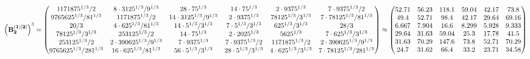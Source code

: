 \documentclass[10pt,a4paper]{article}
\begin{document}
	\[
		\left(\bold{B_2^{(1)[2]}}\right)^{3} = 
		\begin{pmatrix}
			{{1171875^ {1 / 3}}} / {{2}} & {{8} \cdot {3125^ {1 / 3}}} / {{9^ {1 / 3}}} & {{28} \cdot {75^ {1 / 3}}}{} & {{14} \cdot {75^ {1 / 3}}}{} & {{2} \cdot {9375^ {1 / 3}}}{} & {{7} \cdot {9375^ {1 / 3}}} / {{2}} \\
			{{9765625^ {1 / 3}}} / {{81^ {1 / 3}}} & {{1171875^ {1 / 3}}} / {{2}} & {{14} \cdot {3125^ {1 / 3}}} / {{9^ {1 / 3}}} & {{2} \cdot {9375^ {1 / 3}}}{} & {{78125^ {1 / 3}}} / {{3^ {1 / 3}}} & {{7} \cdot {78125^ {1 / 3}}} / {{81^ {1 / 3}}} \\
			{{20}} / {{3}} & {{4} \cdot {625^ {1 / 3}}} / {{81^ {1 / 3}}} & {{14} \cdot {5^ {1 / 3}}} / {{3^ {1 / 3}}} & {{7} \cdot {5^ {1 / 3}}} / {{3^ {1 / 3}}} & {{625^ {1 / 3}}} / {{3^ {1 / 3}}} & {{28}} / {{3}} \\
			{{78125^ {1 / 3}}} / {{3^ {1 / 3}}} & {{253125^ {1 / 3}}} / {{2}} & {{14} \cdot {75^ {1 / 3}}}{} & {{2} \cdot {2025^ {1 / 3}}}{} & {{5625^ {1 / 3}}}{} & {{7} \cdot {625^ {1 / 3}}} / {{3^ {1 / 3}}} \\
			{{253125^ {1 / 3}}} / {{2}} & {{2} \cdot {390625^ {1 / 3}}} / {{9^ {1 / 3}}} & {{7} \cdot {9375^ {1 / 3}}}{} & {{7} \cdot {9375^ {1 / 3}}} / {{2}} & {{1171875^ {1 / 3}}} / {{2}} & {{2} \cdot {390625^ {1 / 3}}} / {{9^ {1 / 3}}} \\
			{{9765625^ {1 / 3}}} / {{2}{81^ {1 / 3}}} & {{16} \cdot {625^ {1 / 3}}} / {{81^ {1 / 3}}} & {{56} \cdot {5^ {1 / 3}}} / {{3^ {1 / 3}}} & {{28} \cdot {5^ {1 / 3}}} / {{3^ {1 / 3}}} & {{4} \cdot {625^ {1 / 3}}} / {{3^ {1 / 3}}} & {{7} \cdot {78125^ {1 / 3}}} / {{2}{81^ {1 / 3}}} \\
		\end{pmatrix}
		\approx
		\begin{pmatrix}
			52.71    & 56.23    & 118.1    & 59.04    & 42.17    & 73.8     \\
			49.4     & 52.71    & 98.4     & 42.17    & 29.64    & 69.16    \\
			6.667    & 7.904    & 16.6     & 8.299    & 5.928    & 9.333    \\
			29.64    & 31.63    & 59.04    & 25.3     & 17.78    & 41.5     \\
			31.63    & 70.29    & 147.6    & 73.8     & 52.71    & 70.29    \\
			24.7     & 31.62    & 66.4     & 33.2     & 23.71    & 34.58    \\
		\end{pmatrix}
	\]
\end{document}
